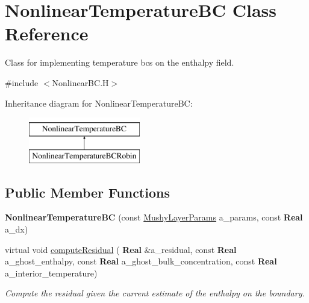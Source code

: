 \hypertarget{class_nonlinear_temperature_b_c}{}\section{Nonlinear\+Temperature\+BC Class Reference}
\label{class_nonlinear_temperature_b_c}


Class for implementing temperature bcs on the enthalpy field.  




{\ttfamily \#include $<$Nonlinear\+B\+C.\+H$>$}

Inheritance diagram for Nonlinear\+Temperature\+BC\+:\begin{figure}[H]
\begin{center}
\leavevmode
\includegraphics[height=2.000000cm]{class_nonlinear_temperature_b_c}
\end{center}
\end{figure}
\subsection*{Public Member Functions}
\begin{DoxyCompactItemize}
\item 
\mbox{\label{class_nonlinear_temperature_b_c_acb225b8e7c46f557935ed2b31344dedc}} 
{\bfseries Nonlinear\+Temperature\+BC} (const \hyperlink{class_mushy_layer_params}{Mushy\+Layer\+Params} a\+\_\+params, const \textbf{ Real} a\+\_\+dx)
\item 
\mbox{\label{class_nonlinear_temperature_b_c_ade1b56f6ac3b8f19d9f3374976bc6df9}} 
virtual void \hyperlink{class_nonlinear_temperature_b_c_ade1b56f6ac3b8f19d9f3374976bc6df9}{compute\+Residual} (\textbf{ Real} \&a\+\_\+residual, const \textbf{ Real} a\+\_\+ghost\+\_\+enthalpy, const \textbf{ Real} a\+\_\+ghost\+\_\+bulk\+\_\+concentration, const \textbf{ Real} a\+\_\+interior\+\_\+temperature)
\begin{DoxyCompactList}\small\item\em Compute the residual given the current estimate of the enthalpy on the boundary. \end{DoxyCompactList}\end{DoxyCompactItemize}
